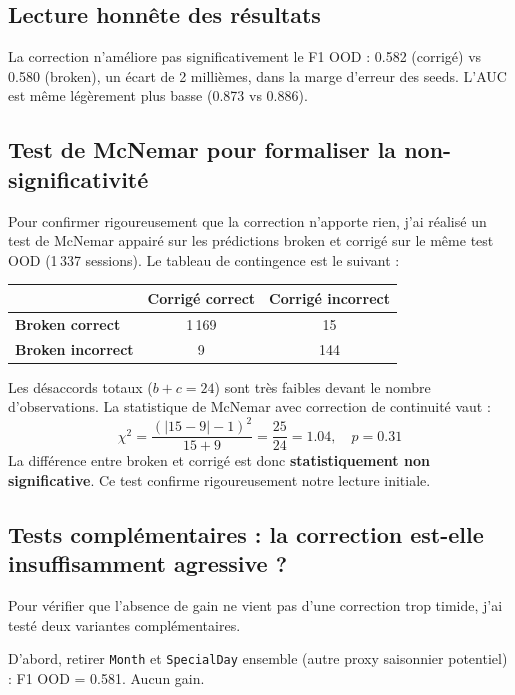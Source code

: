 \documentclass[11pt,a4paper]{article}
\newcommand{\code}[1]{\texttt{\small#1}}
\begin{document}
\subsection*{Lecture honnête des résultats}

La correction n'améliore pas significativement le F1 OOD : 0.582 (corrigé) vs 0.580 (broken), un écart de 2 millièmes, dans la marge d'erreur des seeds. L'AUC est même légèrement plus basse (0.873 vs 0.886).

\subsection*{Test de McNemar pour formaliser la non-significativité}

Pour confirmer rigoureusement que la correction n'apporte rien, j'ai réalisé un test de McNemar appairé sur les prédictions broken et corrigé sur le même test OOD (1\,337 sessions). Le tableau de contingence est le suivant :

\begin{center}
\begin{tabular}{lcc}
\toprule
                          & \textbf{Corrigé correct} & \textbf{Corrigé incorrect} \\
\midrule
\textbf{Broken correct}   & 1\,169 & 15 \\
\textbf{Broken incorrect} & 9      & 144 \\
\bottomrule
\end{tabular}
\end{center}

Les désaccords totaux ($b + c = 24$) sont très faibles devant le nombre d'observations. La statistique de McNemar avec correction de continuité vaut :
\[
\chi^2 = \frac{(|15 - 9| - 1)^2}{15 + 9} = \frac{25}{24} = 1.04, \quad p = 0.31
\]
La différence entre broken et corrigé est donc \textbf{statistiquement non significative}. Ce test confirme rigoureusement notre lecture initiale.

\subsection*{Tests complémentaires : la correction est-elle insuffisamment agressive ?}

Pour vérifier que l'absence de gain ne vient pas d'une correction trop timide, j'ai testé deux variantes complémentaires.

D'abord, retirer \code{Month} et \code{SpecialDay} ensemble (autre proxy saisonnier potentiel) : F1 OOD = 0.581. Aucun gain.
\end{document}
